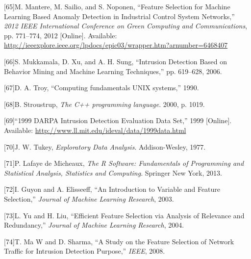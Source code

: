 \documentclass[11pt,]{article}
\begin{document}
{[}65{]}M. Mantere, M. Sailio, and S. Noponen, ``Feature Selection for
Machine Learning Based Anomaly Detection in Industrial Control System
Networks,'' \emph{2012 IEEE International Conference on Green Computing
and Communications}, pp. 771--774, 2012 {[}Online{]}. Available:
\url{http://ieeexplore.ieee.org/lpdocs/epic03/wrapper.htm?arnumber=6468407}

{[}66{]}S. Mukkamala, D. Xu, and A. H. Sung, ``Intrusion Detection Based
on Behavior Mining and Machine Learning Techniques,'' pp. 619--628,
2006.

{[}67{]}D. A. Troy, ``Computing fundamentals UNIX systems,'' 1990.

{[}68{]}B. Stroustrup, \emph{The C++ programming language}. 2000, p.
1019.

{[}69{]}``1999 DARPA Intrusion Detection Evaluation Data Set,'' 1999
{[}Online{]}. Available:
\url{http://www.ll.mit.edu/ideval/data/1999data.html}

{[}70{]}J. W. Tukey, \emph{Exploratory Data Analysis}. Addison-Wesley,
1977.

{[}71{]}P. Lafaye de Micheaux, \emph{The R Software: Fundamentals of
Programming and Statistical Analysis, Statistics and Computing}.
Springer New York, 2013.

{[}72{]}I. Guyon and A. Elisseeff, ``An Introduction to Variable and
Feature Selection,'' \emph{Journal of Machine Learning Research}, 2003.

{[}73{]}L. Yu and H. Liu, ``Efficient Feature Selection via Analysis of
Relevance and Redundancy,'' \emph{Journal of Machine Learning Research},
2004.

{[}74{]}T. Ma W and D. Sharma, ``A Study on the Feature Selection of
Network Traffic for Intrusion Detection Purpose,'' \emph{IEEE}, 2008.
\end{document}
